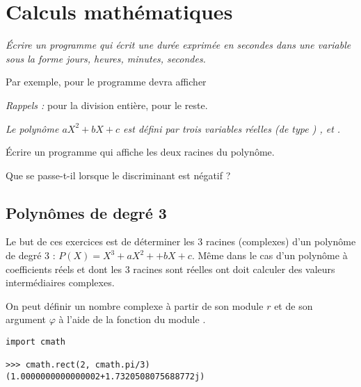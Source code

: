 \section{Calculs mathématiques}
\begin{Exercise}
{\it Écrire un programme qui écrit une durée exprimée en secondes dans une variable  sous la forme jours, heures, minutes, secondes.

Par exemple, pour  le programme devra afficher 


\textit{Rappels :} \type{//} pour la division entière, \type{\%} pour le reste.}
\end{Exercise}
\begin{Exercise}
{\it Le polynôme $aX^2 + b X +c$ est défini par trois variables réelles (de type ) ,  et . 

Écrire un programme qui affiche les deux racines du polynôme.

Que se passe-t-il lorsque le discriminant est négatif ?}
\end{Exercise}
\subsection{Polynômes de degré 3}
Le but de ces exercices est de déterminer les 3 racines (complexes) d'un polynôme de degré 3 : $P(X)=X^3+aX^2++bX+c$. Même dans le cas d'un polynôme à coefficients réels et dont les 3 racines sont réelles ont doit calculer des valeurs intermédiaires complexes. 

On peut définir un nombre complexe à partir de son module $r$ et de son argument $\varphi$ à l'aide de la fonction  du module .
\begin{lstlisting}
import cmath 

>>> cmath.rect(2, cmath.pi/3)
(1.0000000000000002+1.7320508075688772j)
\end{lstlisting}

